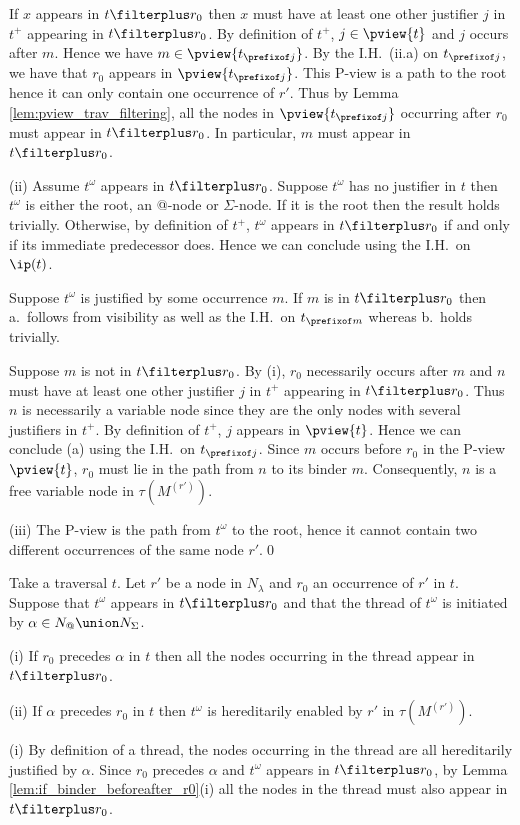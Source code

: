 If $x$ appears in $t\filterplus r_0$ then
$x$ must have at least one other justifier $j$ in $t^+$ appearing in $t\filterplus r_0$. By definition of $t^+$, $j\in \pview{t}$ and $j$ occurs after $m$. Hence we have $m \in \pview{t_{\prefixof j}}$.
By the I.H.\ (ii.a) on $t_{\prefixof j}$, we have that $r_0$ appears in $\pview{t_{\prefixof j}}$. This P-view is a path to the root hence it can only contain one occurrence of $r'$. Thus by
Lemma \ref{lem:pview_trav_filtering}, all the nodes in
$\pview{t_{\prefixof j}}$ occurring after $r_0$ must appear in $t\filterplus r_0$. In particular, $m$ must appear in $t\filterplus r_0$.

\noindent (ii) Assume $t^\omega$ appears in $t\filterplus r_0$.
Suppose $t^\omega$ has no justifier in $t$ then $t^\omega$ is either the root, an @-node or $\Sigma$-node. If it is the root then the result holds trivially. Otherwise, by definition of $t^+$, $t^\omega$
appears in $t\filterplus r_0$ if and only if its immediate predecessor does. Hence we can conclude using the I.H.\ on $\ip(t)$.

Suppose $t^\omega$ is justified by some occurrence $m$.
If $m$ is in $t\filterplus r_0$ then a.\ follows from
visibility as well as the I.H.\ on $t_{\prefixof m}$ whereas b.\ holds trivially.

Suppose $m$ is not in $t\filterplus r_0$.
By (i), $r_0$ necessarily occurs after $m$ and $n$ must have at least one other justifier $j$ in $t^+$ appearing in $t\filterplus r_0$. Thus $n$ is necessarily a variable node since they are the only nodes with several justifiers in $t^+$. By definition of $t^+$, $j$ appears in $\pview{t}$. Hence we can conclude (a) using the I.H.\ on $t_{\prefixof j}$. Since $m$ occurs before $r_0$ in the P-view $\pview{t}$, $r_0$ must lie in the path from $n$ to its binder $m$. Consequently, $n$ is a free variable node in $\tau(M^{(r')})$.

\noindent (iii) The P-view is the path from $t^\omega$ to the root, hence it cannot contain two different occurrences of the same node $r'$.\qed



\begin{lemma}
\label{lem:thread_filterplus}
Take a traversal $t$.  Let $r'$ be a node in $N_\lambda$ and $r_0$ an occurrence of $r'$ in $t$.
Suppose that $t^\omega$ appears in $t\filterplus r_0$ and that the thread of $t^\omega$ is initiated by $\alpha \in N_@ \union N_\Sigma$.

(i) If $r_0$ precedes $\alpha$ in $t$ then all the nodes occurring in the thread appear in $t\filterplus r_0$.

(ii) If $\alpha$ precedes $r_0$ in $t$ then
    $t^\omega$ is hereditarily enabled by $r'$ in $\tau(M^{(r')})$.
\end{lemma}
\proof
(i) By definition of a thread, the nodes occurring in the thread
are all hereditarily justified by $\alpha$.
Since $r_0$ precedes $\alpha$ and $t^\omega$ appears in $t\filterplus r_0$, by Lemma \ref{lem:if_binder_beforeafter_r0}(i) all the nodes in the thread must also appear in $t \filterplus r_0$.

